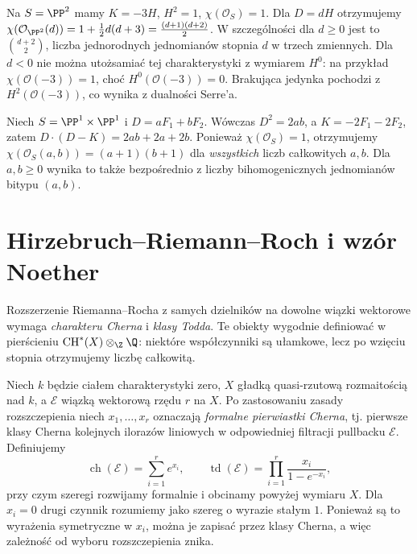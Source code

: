 \begin{przyklad}
\label{prz:ga7-rr-p2}
Na $S=\PP^2$ mamy $K=-3H$, $H^2=1$,
$\chi(\mathcal O_S)=1$. Dla $D=dH$ otrzymujemy
$\chi(\mathcal O_{\PP^2}(d))=1+\frac12d(d+3)
=\frac{(d+1)(d+2)}2$.
W szczególności dla $d\ge0$ jest to
$\binom{d+2}{2}$, liczba jednorodnych jednomianów
stopnia $d$ w trzech zmiennych.
Dla $d<0$ nie można utożsamiać tej charakterystyki
z wymiarem $H^0$: na przykład
$\chi(\mathcal O(-3))=1$, choć $H^0(\mathcal O(-3))=0$.
Brakująca jedynka pochodzi z $H^2(\mathcal O(-3))$,
co wynika z dualności Serre'a.
\end{przyklad}

\begin{przyklad}
Niech $S=\PP^1\times\PP^1$ i
$D=aF_1+bF_2$. Wówczas $D^2=2ab$, a
$K=-2F_1-2F_2$, zatem
$D\cdot(D-K)=2ab+2a+2b$.
Ponieważ $\chi(\mathcal O_S)=1$,
otrzymujemy
$\chi(\mathcal O_S(a,b))=(a+1)(b+1)$
dla \emph{wszystkich} liczb całkowitych $a,b$.
Dla $a,b\ge0$ wynika to także bezpośrednio z liczby
bihomogenicznych jednomianów bitypu $(a,b)$.
\end{przyklad}

\section{Hirzebruch--Riemann--Roch i wzór Noether}
\label{sec:ga7-noether}

Rozszerzenie Riemanna--Rocha z samych dzielników
na dowolne wiązki wektorowe wymaga \emph{charakteru Cherna}
i \emph{klasy Todda}. Te obiekty wygodnie definiować
w pierścieniu $\operatorname{CH}^*(X)\otimes_\Z\Q$:
niektóre współczynniki są ułamkowe, lecz po wzięciu
stopnia otrzymujemy liczbę całkowitą.

\begin{definicja}
\label{def:ga7-ch-td}
Niech $k$ będzie ciałem charakterystyki zero,
$X$ gładką quasi-rzutową rozmaitością nad $k$,
a $\mathcal E$ wiązką wektorową rzędu $r$ na $X$.
Po zastosowaniu zasady rozszczepienia niech
$x_1,\ldots,x_r$ oznaczają \emph{formalne pierwiastki Cherna},
tj. pierwsze klasy Cherna kolejnych ilorazów liniowych
w odpowiedniej filtracji pullbacku $\mathcal E$.
Definiujemy
\[
\operatorname{ch}(\mathcal E)=\sum_{i=1}^r e^{x_i},
\qquad
\operatorname{td}(\mathcal E)=\prod_{i=1}^r
\frac{x_i}{1-e^{-x_i}},
\]
przy czym szeregi rozwijamy formalnie i obcinamy
powyżej wymiaru $X$. Dla $x_i=0$ drugi czynnik
rozumiemy jako szereg o wyrazie stałym $1$.
Ponieważ są to wyrażenia symetryczne w $x_i$,
można je zapisać przez klasy Cherna, a więc
zależność od wyboru rozszczepienia znika.
\end{definicja}

